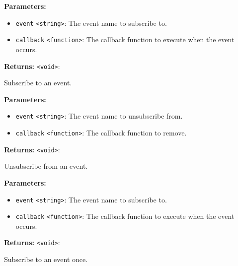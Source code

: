 \documentclass[12pt,a4paper]{article}
\begin{document}
\vspace{5mm}
\noindent {}


\noindent \textbf{Parameters:}
\begin{itemize}
  \item \texttt{event} \texttt{<string>}: The event name to subscribe to.
  \item \texttt{callback} \texttt{<function>}: The callback function to execute when the event occurs.
\end{itemize}

\noindent \textbf{Returns:} \texttt{<void>}: 

\noindent Subscribe to an event.

\vspace{5mm}
\noindent {}


\noindent \textbf{Parameters:}
\begin{itemize}
  \item \texttt{event} \texttt{<string>}: The event name to unsubscribe from.
  \item \texttt{callback} \texttt{<function>}: The callback function to remove.
\end{itemize}

\noindent \textbf{Returns:} \texttt{<void>}: 

\noindent Unsubscribe from an event.

\vspace{5mm}
\noindent {}


\noindent \textbf{Parameters:}
\begin{itemize}
  \item \texttt{event} \texttt{<string>}: The event name to subscribe to.
  \item \texttt{callback} \texttt{<function>}: The callback function to execute when the event occurs.
\end{itemize}

\noindent \textbf{Returns:} \texttt{<void>}: 

\noindent Subscribe to an event once.
\end{document}
